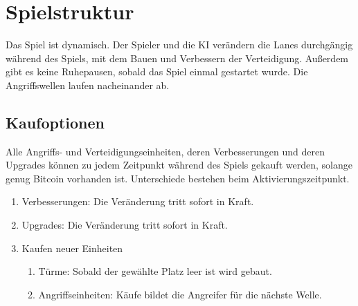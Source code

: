 \section{Spielstruktur}

%
%
%
%

Das Spiel ist dynamisch. Der Spieler und die KI verändern die Lanes 
durchgängig während des Spiels, mit dem Bauen und Verbessern der Verteidigung.
Außerdem gibt es keine Ruhepausen, sobald das Spiel einmal gestartet wurde. 
Die Angriffswellen laufen nacheinander ab.

\subsection{Kaufoptionen}
\label{subsec:kaufoptionen}
    Alle Angriffs- und Verteidigungseinheiten, deren Verbesserungen und deren
    Upgrades können zu jedem Zeitpunkt während des Spiels gekauft werden, 
    solange genug Bitcoin vorhanden ist. Unterschiede bestehen beim 
    Aktivierungszeitpunkt.

	\begin{enumerate}
		\item Verbesserungen: Die Veränderung tritt sofort in Kraft.
		\item Upgrades: Die Veränderung tritt sofort in Kraft.
    		\item Kaufen neuer Einheiten
		\begin{enumerate}
			\item Türme: Sobald der gewählte Platz leer ist wird
				gebaut.
			\item Angriffseinheiten: Käufe bildet die Angreifer 
				für die nächste Welle.
    		\end{enumerate}
	\end{enumerate}

